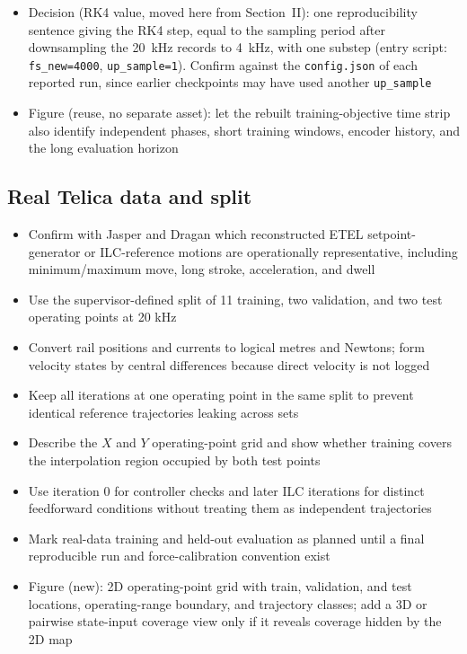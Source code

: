 \begin{itemize}
\item Decision (RK4 value, moved here from Section~II): one reproducibility sentence giving the RK4 step, equal to the sampling period after downsampling the 20~kHz records to 4~kHz, with one substep (entry script: \texttt{fs\_new=4000}, \texttt{up\_sample=1}). Confirm against the \texttt{config.json} of each reported run, since earlier checkpoints may have used another \texttt{up\_sample}
\item Figure (reuse, no separate asset): let the rebuilt training-objective time strip also identify independent phases, short training windows, encoder history, and the long evaluation horizon
\end{itemize}

\subsection{Real Telica data and split}
\begin{itemize}
\item Confirm with Jasper and Dragan which reconstructed ETEL setpoint-generator or ILC-reference motions are operationally representative, including minimum/maximum move, long stroke, acceleration, and dwell
\item Use the supervisor-defined split of 11 training, two validation, and two test operating points at 20 kHz
\item Convert rail positions and currents to logical metres and Newtons; form velocity states by central differences because direct velocity is not logged
\item Keep all iterations at one operating point in the same split to prevent identical reference trajectories leaking across sets
\item Describe the $X$ and $Y$ operating-point grid and show whether training covers the interpolation region occupied by both test points
\item Use iteration 0 for controller checks and later ILC iterations for distinct feedforward conditions without treating them as independent trajectories
\item Mark real-data training and held-out evaluation as planned until a final reproducible run and force-calibration convention exist
\item Figure (new): 2D operating-point grid with train, validation, and test locations, operating-range boundary, and trajectory classes; add a 3D or pairwise state-input coverage view only if it reveals coverage hidden by the 2D map
\end{itemize}

